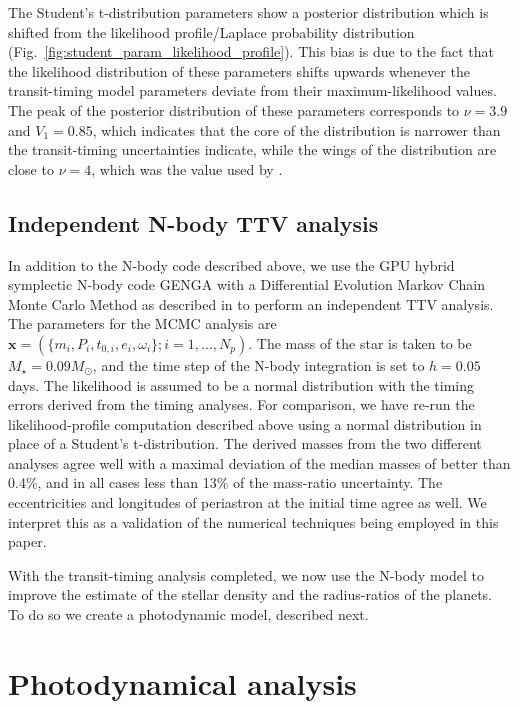 \documentclass[fleqn,usenatbib]{mnras} %
\begin{document}
The Student's t-distribution parameters show a posterior distribution which is shifted from the likelihood profile/Laplace probability distribution (Fig.\ \ref{fig:student_param_likelihood_profile}).  This bias is due to the fact that the likelihood distribution of these parameters shifts upwards whenever the transit-timing model parameters deviate from their maximum-likelihood values.  The peak of  the  posterior distribution of these parameters corresponds to
$\nu = 3.9$ and $V_1 = 0.85$, which indicates that the core of the distribution is narrower than the transit-timing uncertainties indicate, while the wings of the distribution are close to $\nu = 4$, which was the value used by
\citet{JontofHutter2016}.



\subsection{Independent N-body TTV analysis}

In addition to the N-body code described above, we use the GPU hybrid symplectic N-body code GENGA \citep{Grimm2014} with a Differential Evolution Markov Chain Monte Carlo Method  \citep[DEMCMC;][]{terBraak2006} as described in \citet{Grimm2018} to perform an independent TTV analysis. The parameters for the MCMC analysis are $\mathbf{x} = (\{m_i, P_i,t_{0,i},e_i,\omega_i\};i=1,...,N_p)$. The mass of the star is taken to be $M_{\star} = 0.09 M_{\odot}$, and the time step of the N-body integration is set to $h=0.05$ days.  The
likelihood is assumed to be a normal distribution with the timing errors derived from
the timing analyses.  For comparison, we have re-run the likelihood-profile
computation described above using a normal distribution in place of a Student's t-distribution.
The derived masses from the two different analyses agree well with a maximal deviation of the median masses of better than 0.4\%, and in all cases less than 13\% of the mass-ratio uncertainty.  The eccentricities and longitudes of periastron at the initial time agree as well.  We interpret this as a validation of the numerical techniques being employed in this paper.

With the transit-timing analysis completed, we now use the N-body model to improve the estimate of the stellar density and the radius-ratios of the planets.  To do so we create a photodynamic model, described next.

\section{Photodynamical analysis}\label{sec:photodynamics}
\end{document}
